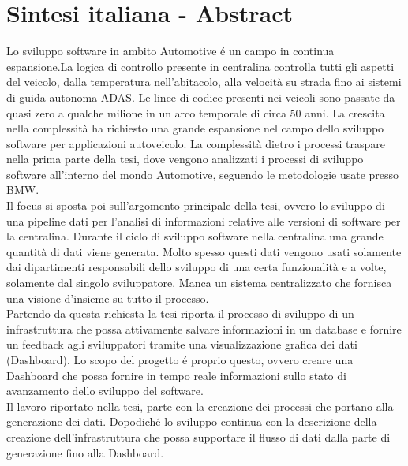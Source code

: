 \documentclass[../main.tex]{subfiles}
\begin{document}
\section{Sintesi italiana - Abstract}
Lo sviluppo software in ambito Automotive é un campo in continua espansione.La logica di controllo presente in centralina controlla tutti gli aspetti del veicolo, dalla temperatura nell'abitacolo, alla velocità su strada fino ai sistemi di guida autonoma \gls{ADAS}. 
Le linee di codice presenti nei veicoli sono passate da quasi zero a qualche milione in un arco temporale di circa 50 anni. La crescita nella complessità ha richiesto una grande espansione nel campo dello sviluppo software per applicazioni autoveicolo. La complessità dietro i processi traspare nella prima parte della tesi, dove vengono analizzati i processi di sviluppo software all'interno del mondo Automotive, seguendo le metodologie usate presso \gls{BMW}.\\
Il focus si sposta poi sull'argomento principale della tesi, ovvero lo sviluppo di una pipeline dati per l'analisi di informazioni relative alle versioni di software per la centralina. Durante il ciclo di sviluppo software nella centralina una grande quantità di dati viene generata. Molto spesso questi dati vengono usati solamente dai dipartimenti responsabili dello sviluppo di una certa funzionalità e a volte, solamente dal singolo sviluppatore. Manca un sistema centralizzato che fornisca una visione d'insieme su tutto il processo.\\
Partendo da questa richiesta la tesi riporta il processo di sviluppo di un infrastruttura che possa attivamente salvare informazioni in un database e fornire un feedback agli sviluppatori tramite una visualizzazione grafica dei dati (Dashboard). Lo scopo del progetto é proprio questo, ovvero creare una Dashboard che possa fornire in tempo reale informazioni sullo stato di avanzamento dello sviluppo del software.\\
Il lavoro riportato nella tesi, parte con la creazione dei processi che portano alla generazione dei dati. Dopodiché lo sviluppo continua con la descrizione della creazione dell'infrastruttura che possa supportare il flusso di dati dalla parte di generazione fino alla Dashboard. 
\end{document}
